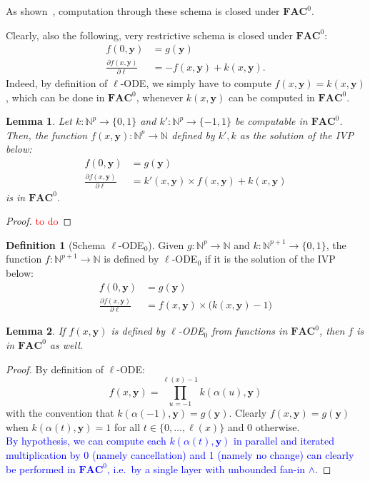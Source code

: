 \documentclass[11pt, oneside]{article}
\newcommand{\Nat}{\mathbb{N}}
\newcommand{\AC}{\mathbf{FAC}}
\newcommand{\tu}[1]{\mathbf{#1}}
\newtheorem{lemma}{Lemma}
\theoremstyle{definition}
\newtheorem{defn}{Definition}
\begin{document}
{\noindent
As shown~\cite[Prop. 12, 15, 17]{ADK24a}, computation through these schema is closed under $\AC^0$.


Clearly, also the following, very restrictive schema is closed under $\AC^0$:
\begin{align*}
    f(0, \tu y)  &= g(\tu y)
    \\
    \frac{\partial f(x, \tu y)}{\partial \ell} &= - f(x, \tu y) + k(x, \tu y).
\end{align*}
Indeed, by definition of $\ell$-ODE, we simply have to compute $f(x, \tu y) = k(x, \tu y)$, which can be done in $\AC^0$, whenever $k(x, \tu y)$ can be computed in $\AC^0$.

\begin{lemma}
    Let $k: \Nat^{p} \to \{0, 1\}$ and $k': \Nat^{p} \to \{-1,1\}$ be computable in $\AC^0$. 
    Then, the function $f(x, \tu y): \Nat^{p} \to \Nat$ defined by $k', k$ as the solution of the IVP below:
        \begin{align*}
            f(0, \tu y) &= g(\tu y) \\
            \frac{\partial f(x, \tu y)}{\partial \ell} &= k'(x, \tu y) \times f(x, \tu y) + k(x, \tu y)
        \end{align*}
    is in $\AC^0$.
\end{lemma}

\begin{proof}
    \textcolor{red}{to do}
\end{proof}

\begin{defn}[Schema $\ell$-ODE$_0$]
    Given $g:\Nat^p \to \Nat$ and $k: \Nat^{p+1} \to \{0,1\}$, the function $f:\Nat^{p+1}\to \Nat$ is defined by $\ell$-ODE$_0$ if it is the solution of the IVP below:
    \begin{align*}
        f(0, \tu y) &= g(\tu y) \\
        \frac{\partial f(x, \tu y)}{\partial \ell} &= f(x, \tu y) \times \big(k(x, \tu y) -1\big)
    \end{align*}
\end{defn}

\begin{lemma}
    If $f(x, \tu y)$ is defined by $\ell$-ODE$_0$ from functions in $\AC^0$, then $f$ is in $\AC^0$ as well.
\end{lemma}
\begin{proof}
    By definition of $\ell$-ODE:
    $$
        f(x, \tu y) = \prod^{\ell(x)-1}_{u=-1} k(\alpha(u), \tu y)
    $$
    with the convention that $k(\alpha(-1), \tu y)=g(\tu y)$.
    Clearly $f(x, \tu y)=g(\tu y)$ when $k(\alpha(t), \tu y)=1$ for all $t\in \{0, \dots, \ell(x)\}$ and 0 otherwise.
    \\
    \textcolor{blue}{By hypothesis, we can compute each $k(\alpha(t), \tu y)$ in parallel and iterated multiplication by 0 (namely cancellation) and 1 (namely no change) can clearly be performed in $\AC^0$, i.e.~by a single layer with unbounded fan-in $\wedge$.}
\end{proof}

}
\end{document}
